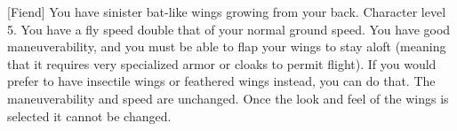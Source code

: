  {[Fiend]}
\descfeat
{You have sinister bat-like wings growing from your back.}
{Character level 5.}
{You have a fly speed double that of your normal ground speed. You have good maneuverability, and you must be able to flap your wings to stay aloft (meaning that it requires very specialized armor or cloaks to permit flight).}
{If you would prefer to have insectile wings or feathered wings instead, you can do that. The maneuverability and speed are unchanged. Once the look and feel of the wings is selected it cannot be changed.}